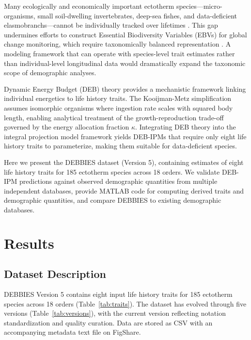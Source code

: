 \documentclass[11pt]{article}
\begin{document}
Many ecologically and economically important ectotherm species---micro-organisms, small soil-dwelling invertebrates, deep-sea fishes, and data-deficient elasmobranchs---cannot be individually tracked over lifetimes \citep{dulvy2014extinction}. This gap undermines efforts to construct Essential Biodiversity Variables (EBVs) for global change monitoring, which require taxonomically balanced representation \citep{pereira2017ebv, jetz2019essential}. A modeling framework that can operate with species-level trait estimates rather than individual-level longitudinal data would dramatically expand the taxonomic scope of demographic analyses.

Dynamic Energy Budget (DEB) theory \citep{kooijman2000dynamic} provides a mechanistic framework linking individual energetics to life history traits. The Kooijman-Metz simplification \citep{kooijman1986energy} assumes isomorphic organisms where ingestion rate scales with squared body length, enabling analytical treatment of the growth-reproduction trade-off governed by the energy allocation fraction $\kappa$. Integrating DEB theory into the integral projection model framework \citep{easterling2000size, ellner2006integral, rees2014integral} yields DEB-IPMs \citep{smallegange2017mechanistic} that require only eight life history traits to parameterize, making them suitable for data-deficient species.

Here we present the DEBBIES dataset (Version 5), containing estimates of eight life history traits for 185 ectotherm species across 18 orders. We validate DEB-IPM predictions against observed demographic quantities from multiple independent databases, provide MATLAB code for computing derived traits and demographic quantities, and compare DEBBIES to existing demographic databases.

\section{Results}

\subsection{Dataset Description}

DEBBIES Version 5 contains eight input life history traits for 185 ectotherm species across 18 orders (Table~\ref{tab:traits}). The dataset has evolved through five versions (Table~\ref{tab:versions}), with the current version reflecting notation standardization and quality curation. Data are stored as CSV with an accompanying metadata text file on FigShare.
\end{document}
